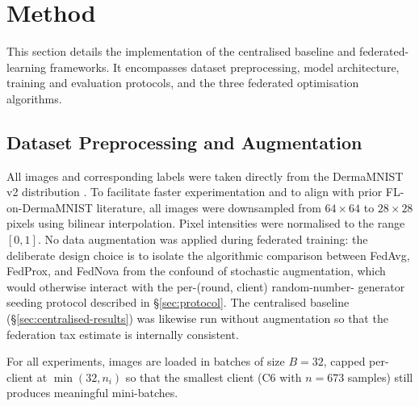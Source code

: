 \documentclass[11pt,a4paper]{report}  %
\begin{document}

\chapter{Method}
\label{ch:method}

This section details the implementation of the centralised baseline
and federated-learning frameworks. It encompasses dataset
preprocessing, model architecture, training and evaluation protocols,
and the three federated optimisation algorithms.

\section{Dataset Preprocessing and Augmentation}
\label{sec:dataset-preproc}


All images and corresponding labels were taken directly from the
DermaMNIST v2 distribution \citep{yang2023medmnistv2}. To facilitate
faster experimentation and to align with prior FL-on-DermaMNIST
literature, all images were downsampled from $64 \times 64$ to
$28 \times 28$ pixels using bilinear interpolation. Pixel intensities
were normalised to the range $[0, 1]$. No data augmentation was
applied during federated training: the deliberate design choice is to
isolate the algorithmic comparison between FedAvg, FedProx, and
FedNova from the confound of stochastic augmentation, which would
otherwise interact with the per-(round, client) random-number-
generator seeding protocol described in §\ref{sec:protocol}. The
centralised baseline (§\ref{sec:centralised-results}) was likewise run
without augmentation so that the federation tax estimate is internally
consistent.

For all experiments, images are loaded in batches of size $B = 32$,
capped per-client at $\min(32, n_i)$ so that the smallest client
(C6 with $n = 673$ samples) still produces meaningful mini-batches.
\end{document}
